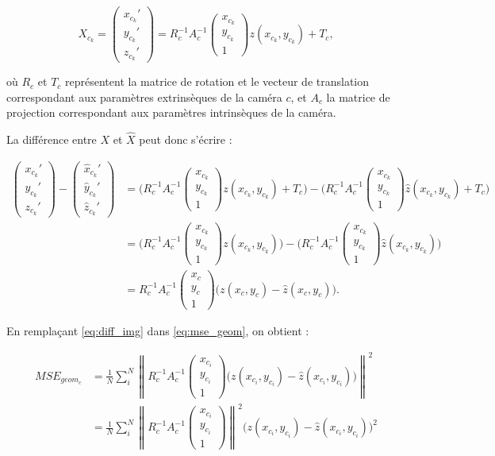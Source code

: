 \documentclass{report}
\newcommand{\norm}[1]{\left\lVert#1\right\rVert}
\newcommand{\icol}[1]{%
  \left(\begin{matrix}#1\end{matrix}\right)%
}
\begin{document}
\begin{equation}
	X_{c_k} = \icol{x_{c_k}'\\y_{c_k}'\\z_{c_k}'} = R_c^{-1}A_c^{-1}\icol{x_{c_k}\\y_{c_k}\\1}z(x_{c_k},y_{c_k})+T_c,
\end{equation}

où $R_c$ et $T_c$ représentent la matrice de rotation et le vecteur de translation correspondant aux paramètres extrinsèques de la caméra $c$, et $A_c$ la matrice de projection correspondant aux paramètres intrinsèques de la caméra.

La différence entre $X$ et $\hat{X}$ peut donc s'écrire :

\begin{align}
	\icol{x_{c_k}'\\y_{c_k}'\\z_{c_k}'} - \icol{\hat{x}_{c_k}'\\\hat{y}_{c_k}'\\\hat{z}_{c_k}'}
	&= \Big(R_c^{-1}A_c^{-1}\icol{x_{c_k}\\y_{c_k}\\1}z(x_{c_k},y_{c_k})+T_c \Big) - \Big(R_c^{-1}A_c^{-1}\icol{x_{c_k}\\y_{c_k}\\1}\hat{z}(x_{c_k},y_{c_k})+T_c \Big) \\
	&= \Big(R_c^{-1}A_c^{-1}\icol{x_{c_k}\\y_{c_k}\\1}z(x_{c_k},y_{c_k}) \Big) - \Big(R_c^{-1}A_c^{-1}\icol{x_{c_k}\\y_{c_k}\\1}\hat{z}(x_{c_k},y_{c_k}) \Big) \\
	&= R_c^{-1}A_c^{-1}\icol{x_c\\y_c\\1}\Big(z(x_c,y_c)-\hat{z}(x_c,y_c)\Big) \label{eq:diff_img}.
\end{align}

En remplaçant \eqref{eq:diff_img} dans \eqref{eq:mse_geom}, on obtient :

\begin{align}
	MSE_{geom_c} &= \frac{1}{N}\sum_i^N\norm{R_c^{-1}A_c^{-1}\icol{x_{c_i}\\y_{c_i}\\1}\Big(z(x_{c_i},y_{c_i})-\hat{z}(x_{c_i},y_{c_i})\Big)}^2 \\
	&= \frac{1}{N}\sum_i^N\norm{R_c^{-1}A_c^{-1}\icol{x_{c_i}\\y_{c_i}\\1}}^2\Big(z(x_{c_i},y_{c_i})-\hat{z}(x_{c_i},y_{c_i})\Big)^2
\end{align}
\end{document}
